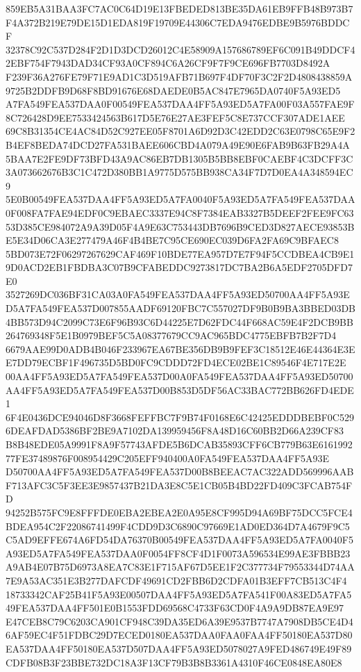 \documentclass[UTF8,fontset=fandol,zihao=-4,a4paper]{ctexart}
\begin{document}
{{859EB5A31BAA3FC7AC0C64D19E13FBEDED813BE35DA61EB9FFB48B973B7F4A372B219E79DE15D1EDA819F19709E44306C7EDA9476EDBE9B5976BDDCF
32378C92C537D284F2D1D3DCD26012C4E58909A157686789EF6C091B49DDCF42EBF754F7943DAD34CF93A0CF894C6A26CF9F7F9CE696FB7703D8492A
F239F36A276FE79F71E9AD1C3D519AFB71B697F4DF70F3C2F2D4808438859A9725B2DDFB9D68F8BD91676E68DAEDE0B5AC847E7965DA0740F5A93ED5
A7FA549FEA537DAA0F00549FEA537DAA4FF5A93ED5A7FA00F03A557FAE9F8C726428D9EE7533424563B617D5E76E27AE3FEF5C8E737CCF307ADE1AEE
69C8B31354CE4AC84D52C927EE05F8701A6D92D3C42EDD2C63E0798C65E9F2B4EF8BEDA74DCD27FA531BAEE606CBD4A079A49E90E6FAB9B63FB29A4A
5BAA7E2FE9DF73BFD43A9AC86EB7DB1305B5BB8EBF0CAEBF4C3DCFF3C3A073662676B3C1C472D380BB1A9775D575BB938CA34F7D7D0EA4A348594EC9
5E0B00549FEA537DAA4FF5A93ED5A7FA0040F5A93ED5A7FA549FEA537DAA0F008FA7FAE94EDF0C9EBAEC3337E94C8F7384EAB3327B5DEEF2FEE9FC63
53D385CE984072A9A39D05F4A9E63C753443DB7696B9CED3D827AECE93853BE5E34D06CA3E277479A46F4B4BE7C95CE690EC039D6FA2FA69C9BFAEC8
5BD073E72F06297267629CAF469F10BDE77EA957D7E7F94F5CCDBEA4CB9E19D0ACD2EB1FBDBA3C07B9CFABEDDC9273817DC7BA2B6A5EDF2705DFD7E0
3527269DC036BF31CA03A0FA549FEA537DAA4FF5A93ED50700AA4FF5A93ED5A7FA549FEA537D007855AADF69120FBC7C557027DF9B0B9BA3BBED03DB
4BB573D94C2099C73E6F96B93C6D44225E7D62FDC44F668AC59E4F2DCB9BB264769348F5E1B0979BEF5C5A08377679CC9AC965BDC4775EBFB7B2F7D4
6679AAE99D0ADB4B046F233967EA67BE356DB9B9FEF3C18512E46E44364E3EE7DD79ECBF1F496735D5BD0FC9CDDD72FD4ECE02BE1C89546F4E717E2E
00AA4FF5A93ED5A7FA549FEA537D00A0FA549FEA537DAA4FF5A93ED50700AA4FF5A93ED5A7FA549FEA537D00B853D5DF56AC33BAC772BB626FD4EDE1
6F4E0436DCE94046D8F3668FEFFBC7F9B74F0168E6C42425EDDDBEBF0C5296DEAFDAD5386BF2BE9A7102DA139959456F8A48D16C60BB2D66A239CF83
B8B48EDE05A9991F8A9F57743AFDE5B6DCAB35893CFF6CB779B63E616199277FE37489876F008954429C205EFF940400A0FA549FEA537DAA4FF5A93E
D50700AA4FF5A93ED5A7FA549FEA537D00B8BEEAC7AC322ADD569996AABF713AFC3C5F3EE3E9857437B21DA3E8C5E1CB05B4BD22FD409C3FCAB754FD
94252B575FC9E8FFFDE0EBA2EBEA2E0A95E8CF995D94A69BF75DCC5FCE4BDEA954C2F22086741499F4CDD9D3C6890C97669E1AD0ED364D7A4679F9C5
C5AD9EFFE674A6FD54DA76370B00549FEA537DAA4FF5A93ED5A7FA0040F5A93ED5A7FA549FEA537DAA0F0054FF8CF4D1F0073A596534E99AE3FBBB23
A9AB4E07B75D6973A8EA7C83E1F715AF67D5EE1F2C377734F79553344D74AA7E9A53AC351E3B277DAFCDF49691CD2FBB6D2CDFA01B3EFF7CB513C4F4
18733342CAF25B41F5A93E00507DAA4FF5A93ED5A7FA541F00A83ED5A7FA549FEA537DAA4FF501E0B1553FDD69568C4733F63CD0F4A9A9DB87EA9E97
E47CEB8C79C6203CA901CF948C39DA35ED6A39E9537B7747A7908DB5CE4D46AF59EC4F51FDBC29D7ECED0180EA537DAA0FAA0FAA4FF50180EA537D80
EA537DAA4FF50180EA537D507DAA4FF5A93ED5078027A9FED486749E49F89CDFB08B3F23BBE732DC18A3F13CF79B3B8B3361A4310F46CE0848EA80E8
}}
\end{document}

